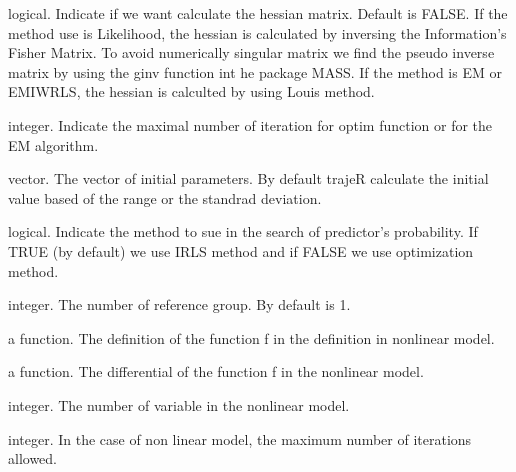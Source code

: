 \documentclass{article}\usepackage[]{graphicx}\usepackage[]{color}
\begin{document}
\begin{Arguments}
\begin{ldescription}
		\item[\code{hessian}] logical. Indicate if we want calculate the hessian matrix. Default is FALSE.
		If the method use is Likelihood, the hessian is calculated by inversing the Information's Fisher Matrix.
		To avoid numerically singular matrix we find the pseudo inverse matrix by using the ginv function int he package MASS.
		If the method is EM or EMIWRLS, the hessian is calculted by using Louis method.

		\item[\code{itermax}] integer. Indicate the maximal number of iteration for optim function or for the EM algorithm.

		\item[\code{paraminit}] vector. The vector of initial parameters. By default trajeR calculate the initial value
		based of the range or the standrad deviation.
		
		\item[\code{ProbIRLS}] logical. Indicate the method to sue in the search of predictor's probability. If TRUE (by default) we use 
IRLS method and if FALSE we use optimization method.

    \item[\code{refgr}] integer. The number of reference group. By default is 1.

		\item[\code{fct}] a function. The definition of the function  f in the definition in nonlinear model.

    \item[\code{diffct}] a function. The differential of the function f in the nonlinear model.

    \item[\code{nbvar}] integer. The number of variable in the nonlinear model.
    
    \item[\code{nls.lmiter}] integer. In the case of non linear model, the maximum number of iterations allowed.

	\end{ldescription}
\end{Arguments}
\end{document}
